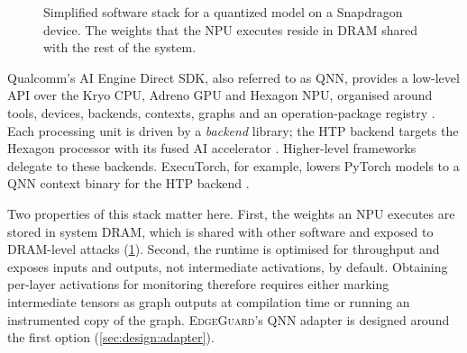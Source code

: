 \begin{figure}[t]
\centering
{}
\caption{Simplified software stack for a quantized model on a Snapdragon device. The weights
that the NPU executes reside in DRAM shared with the rest of the system.}
\label{fig:npu_stack}
\end{figure}

Qualcomm's AI Engine Direct SDK, also referred to as QNN, provides a low-level API over the
Kryo CPU, Adreno GPU and Hexagon NPU, organised around tools, devices, backends, contexts,
graphs and an operation-package registry \cite{qualcomm_qnn}. Each processing unit is driven by a
\emph{backend} library; the HTP backend targets the Hexagon processor with its fused AI
accelerator \cite{qualcomm_qnn_backend}. Higher-level frameworks delegate to these backends.
ExecuTorch, for example, lowers PyTorch models to a QNN context binary for the HTP backend
\cite{executorch_qnn}.

Two properties of this stack matter here. First, the weights an NPU executes are stored in
system DRAM, which is shared with other software and exposed to DRAM-level attacks
(\cref{fig:npu_stack}). Second, the runtime is optimised for throughput and exposes inputs and
outputs, not intermediate activations, by default. Obtaining per-layer activations for
monitoring therefore requires either marking intermediate tensors as graph outputs at
compilation time or running an instrumented copy of the graph. \textsc{EdgeGuard}'s QNN adapter
is designed around the first option (\cref{sec:design:adapter}).

